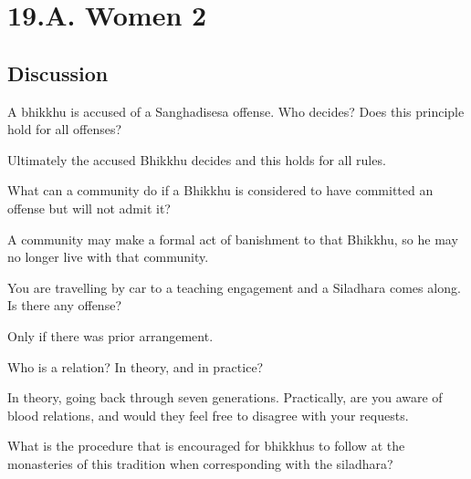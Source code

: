 \chapter{19.A. Women 2}
\renewcommand*{\theChapterTitle}{19.A. Women 2}

\section*{Discussion}


A bhikkhu is accused of a Sanghadisesa offense. Who decides? Does this principle hold for all offenses?

\begin{solution}
  Ultimately the accused Bhikkhu decides and this holds for all rules. 
\end{solution}

\bigskip

What can a community do if a Bhikkhu is considered to have committed an offense but will not admit it?

\begin{solution}
  A community may make a formal act of banishment to that Bhikkhu, so he may no
  longer live with that community.
\end{solution}

\bigskip


You are travelling by car to a teaching engagement and a Siladhara comes along. Is there any offense?

\begin{solution}
  Only if there was prior arrangement.
\end{solution}

\bigskip

Who is a relation? In theory, and in practice?

\begin{solution}
  In theory, going back through seven generations. Practically, are you aware of
  blood relations, and would they feel free to disagree with your requests.
\end{solution}

\bigskip

What is the procedure that is encouraged for bhikkhus to follow at the monasteries of this tradition 
when corresponding with the siladhara?

